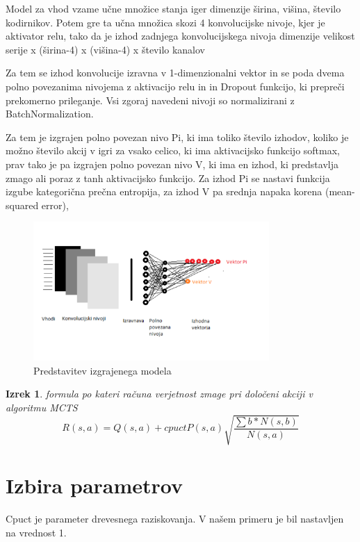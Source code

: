 \documentclass[a4paper, 12pt]{book}
\newtheorem{izrek}{Izrek}[chapter]
\begin{document}
Model za vhod vzame učne množice stanja iger dimenzije širina, višina, število kodirnikov.
Potem gre ta učna množica skozi 4 konvolucijske nivoje, kjer je aktivator relu, tako da je izhod zadnjega konvolucijskega nivoja dimenzije velikost serije  x (širina-4) x (višina-4) x število kanalov

Za tem se izhod konvolucije izravna v 1-dimenzionalni vektor in se poda dvema polno povezanima nivojema z aktivacijo relu in in Dropout funkcijo, ki prepreči prekomerno prileganje.
Vsi zgoraj navedeni nivoji so normalizirani z BatchNormalization.

Za tem je izgrajen polno povezan nivo Pi, ki ima toliko število izhodov, koliko je možno število akcij v igri za vsako celico, ki ima aktivacijsko funkcijo softmax,
prav tako je pa izgrajen polno povezan nivo V, ki ima en izhod, ki predstavlja zmago ali poraz z tanh aktivacijsko funkcijo.
Za izhod Pi se nastavi funkcija izgube kategorična prečna entropija, za izhod V pa srednja napaka korena (mean-squared error),


\begin{figure}[h]
	\begin{center}
		\includegraphics[width=0.8\textwidth]{vizualzacijaModela.pdf}
	\end{center}
	\caption{Predstavitev izgrajenega modela}
	\label{vizualzacijaModela}
\end{figure}

\begin{izrek}
	\label{iz:1}
	formula po kateri računa verjetnost zmage pri določeni akciji v algoritmu MCTS
	\begin{equation}
	R(s,a) = Q(s,a) + cpuctP(s, a)\sqrt{\dfrac{\sum{b}*N(s,b)}{N(s,a)}}
	\label{eq:mctsFormula}
	\end{equation}
\end{izrek}

\section{Izbira parametrov}
Cpuct je parameter drevesnega raziskovanja. V našem primeru je bil nastavljen na vrednost 1.
\end{document}

